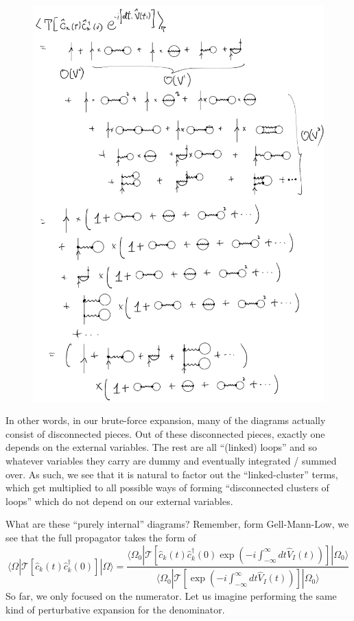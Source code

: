 \begin{figure}[H]
    \centering
    \includegraphics[width=\textwidth]{jupyterbook/data/fig/lec17-fig12.png}
\end{figure}

In other words, in our brute-force expansion, many of the diagrams actually consist of disconnected pieces. Out of these disconnected pieces, exactly one depends on the external variables. The rest are all ``(linked) loops'' and so whatever variables they carry are dummy and eventually integrated / summed over. As such, we see that it is natural to factor out the ``linked-cluster'' terms, which get multiplied to all possible ways of forming ``disconnected clusters of loops'' which do not depend on our external variables.

What are these ``purely internal'' diagrams? Remember, form Gell-Mann-Low, we see that the full propagator takes the form of
\[ \langle \Omega |\mathcal{T} \left[ \hat{c}_k\left( t \right) \hat{c}_{k}^{\dagger}\left( 0 \right) \right] |\Omega \rangle =\frac{\langle \Omega _0|\mathcal{T} \left[ \hat{c}_k\left( t \right) \hat{c}_{k}^{\dagger}\left( 0 \right) \exp \left( -i\int_{-\infty}^{\infty}{dt\hat{V}_I\left( t \right)} \right) \right] |\Omega _0\rangle}{\langle \Omega _0|\mathcal{T} \left[ \exp \left( -i\int_{-\infty}^{\infty}{dt\hat{V}_I\left( t \right)} \right) \right] |\Omega _0\rangle}\]
So far, we only focused on the numerator. Let us imagine performing the same kind of perturbative expansion for the denominator.

